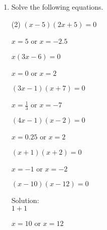 \clearpage


\begin{enumerate} [leftmargin=0cm] 
    \item Solve the following equations.\\
        \begin{tasks}[label=(\alph*), after-item-skip=2pt,after-skip=3pt, label-width=4ex](2)
        \task  $ (x-5)(2x+5)=0                    $  \begin{envAnswer} $ x=5             $    or $ x=-2.5          $\end{envAnswer}  
        \task  $ x(3x-6)=0                        $  \begin{envAnswer} $ x=0             $    or $ x=2             $\end{envAnswer}    
        \task  $ (3x-1)(x+7)=0                    $  \begin{envAnswer} $ x=\frac{1}{3}   $    or $ x=-7            $\end{envAnswer}    
        \task  $ (4x-1)(x-2)=0                    $  \begin{envAnswer} $ x=0.25          $    or $ x=2             $\end{envAnswer}    
        \task  $ (x+1)(x+2)=0                     $  \begin{envAnswer} $ x=-1            $    or $ x=-2            $\end{envAnswer}    
        \task  $ (x-10)(x-12)=0 $         
               \begin{envSolution} 
                    \noindent Solution:\\[15pt]  
                    $ 1+1  $           \\
					   \begin{envAnswer} $ x=10            $    or $ x=12            $\end{envAnswer}   
               \end{envSolution}
			   
        \end{tasks}
\end{enumerate}

